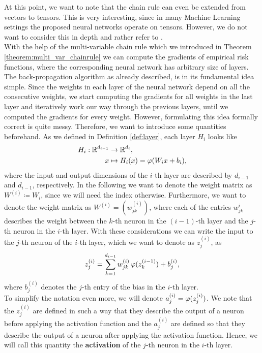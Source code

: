 At this point, we want to note that the chain rule can even be extended from vectors to tensors. This is very interesting, since in many Machine Learning settings the proposed neural networks operate on tensors. However, we do not want to consider this in depth and rather refer to \cite[Chapter~6.5.2]{goodfellow2016deep}.\\
With the help of the multi-variable chain rule which we introduced in Theorem \ref{theorem:multi_var_chainrule} we can compute the gradients of empirical risk functions, where the corresponding neural network has arbitrary size of layers.\\
The back-propagation algorithm as already described, is in its fundamental idea simple. Since the weights in each layer of the neural network depend on all the consecutive weights, we start computing the gradients for all weights in the last layer and iteratively work our way through the previous layers, until we computed the gradients for every weight. However, formulating this idea formally correct is quite messy. Therefore, we want to introduce some quantities beforehand. As we defined in Definition \ref{def:layer}, each layer $H_i$ looks like
\begin{align*}
H_i: \operatorname{\mathbb{R}}^{d_{i-1}} &\to \operatorname{\mathbb{R}}^{d_{i}},\\
x &\mapsto H_i(x) = \operatorname{\varphi}(W_ix + b_i),
\end{align*}
where the input and output dimensions of the $i$-th layer are described by $d_{i-1}$ and $d_{i-1}$, respectively. In the following we want to denote the weight matrix as $W^{(i)}\coloneqq W_i$, since we will need the index otherwise. Furthermore, we want to denote the weight matrix as $W^{(i)} = (w^{(i)}_{jk})$, where each of the entries $w^{i}_{jk}$ describes the weight between the $k$-th neuron in the $(i-1)$-th layer and the $j$-th neuron in the $i$-th layer. With these considerations we can write the input to the $j$-th neuron of the $i$-th layer, which we want to denote as $z_{j}^{(i)}$, as
\begin{align*}
z_{j}^{(i)} = \sum_{k=1}^{d_{i-1}} w^{(i)}_{jk} \operatorname{\varphi} (z_{k}^{(i-1)}) + b_j^{(i)},
\end{align*}
where $b_j^{(i)}$ denotes the $j$-th entry of the bias in the $i$-th layer.\\
To simplify the notation even more, we will denote $a_{j}^{(i)} = \operatorname{\varphi} (z_{j}^{(i)})$. We note that the $z_{j}^{(i)}$ are defined in such a way that they describe the output of a neuron before applying the activation function and the $a_{j}^{(i)}$ are defined so that they describe the output of a neuron after applying the activation function. Hence, we will call this quantity the \textbf{activation} of the $j$-th neuron in the $i$-th layer.\\
